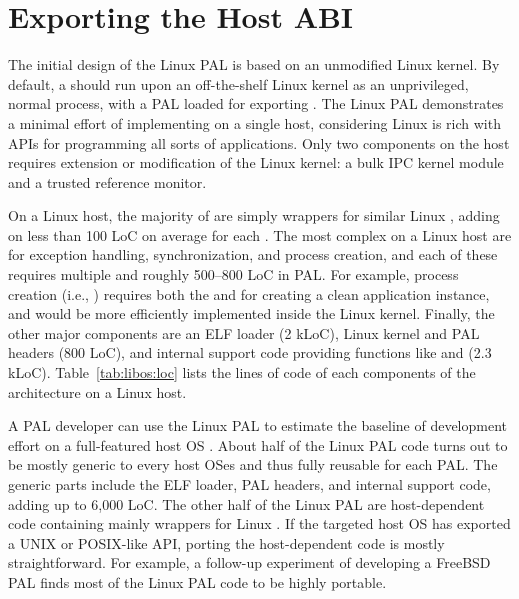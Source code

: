 \section{Exporting the Host ABI}
\label{sec:linux:impl}

The initial design of the Linux PAL is based on an unmodified Linux kernel.
By default, a \graphene{} \picoproc{} should run upon
an off-the-shelf Linux kernel as an unprivileged, normal process, with a PAL loaded for exporting \thehostabi{}.
The Linux PAL demonstrates a minimal effort of implementing \thehostabi{}
on a single host, considering Linux is rich with APIs for programming all sorts of applications.
Only two \graphene{} components on the host requires extension or modification of the Linux kernel: a bulk IPC kernel module and a trusted reference monitor.



On a Linux host,
the majority of \hostapis{} are simply wrappers
for similar Linux \linuxapis{},
adding on less than 100 LoC on average for each \hostapi{}.
The most complex \hostapis{} on a Linux host are for exception handling, synchronization, and process creation, and each of these \hostapis{} requires multiple \linuxapis{} and roughly 500--800 LoC in PAL.
For example, process creation (i.e., ) requires 
both the  and  \linuxapis{}
for creating a clean
application instance, and would be more efficiently
implemented inside the Linux kernel.
Finally, the other major \pal{} components are an ELF loader (2 kLoC),
Linux kernel and PAL headers (800 LoC),
and internal support code providing functions like  and  (2.3 kLoC).
Table~\ref{tab:libos:loc} lists the lines of code of each components of the \graphene{} architecture on a Linux host.


A PAL developer can use the Linux PAL to estimate the baseline of \thehostabi{} development effort on a full-featured host OS .
About half of the Linux PAL code turns out to be
mostly generic to every host OSes
and thus fully reusable for each PAL.
The generic parts include
the ELF loader, PAL headers, and internal support code, adding up to \roughly{}6,000 LoC.
The other half of the Linux PAL are host-dependent code containing mainly wrappers for Linux \linuxapis{}.
If the targeted host OS has exported a UNIX or POSIX-like API,
porting the host-dependent code is mostly straightforward.
For example, a follow-up experiment of developing a FreeBSD PAL finds most of the Linux PAL code to be highly portable.





